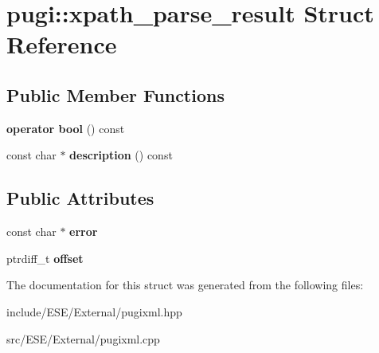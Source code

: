 \hypertarget{structpugi_1_1xpath__parse__result}{\section{pugi\-:\-:xpath\-\_\-parse\-\_\-result Struct Reference}
\label{structpugi_1_1xpath__parse__result}
}
\subsection*{Public Member Functions}
\begin{DoxyCompactItemize}
\item 
\hypertarget{structpugi_1_1xpath__parse__result_a79b82e65183e2fe7e4c866afb02b07c0}{{\bfseries operator bool} () const }\label{structpugi_1_1xpath__parse__result_a79b82e65183e2fe7e4c866afb02b07c0}

\item 
\hypertarget{structpugi_1_1xpath__parse__result_a3de342b3c2c13db7ba9dafba73c06228}{const char $\ast$ {\bfseries description} () const }\label{structpugi_1_1xpath__parse__result_a3de342b3c2c13db7ba9dafba73c06228}

\end{DoxyCompactItemize}
\subsection*{Public Attributes}
\begin{DoxyCompactItemize}
\item 
\hypertarget{structpugi_1_1xpath__parse__result_ab2c625be89b995afac829012bc749fe4}{const char $\ast$ {\bfseries error}}\label{structpugi_1_1xpath__parse__result_ab2c625be89b995afac829012bc749fe4}

\item 
\hypertarget{structpugi_1_1xpath__parse__result_add47d886c654b4d8a836573b2c2a7acb}{ptrdiff\-\_\-t {\bfseries offset}}\label{structpugi_1_1xpath__parse__result_add47d886c654b4d8a836573b2c2a7acb}

\end{DoxyCompactItemize}


The documentation for this struct was generated from the following files\-:\begin{DoxyCompactItemize}
\item 
include/\-E\-S\-E/\-External/pugixml.\-hpp\item 
src/\-E\-S\-E/\-External/pugixml.\-cpp\end{DoxyCompactItemize}
